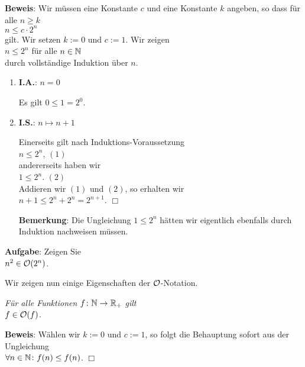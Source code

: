 \noindent
\textbf{Beweis}: Wir m\"ussen eine Konstante $c$ und eine Konstante $k$ angeben, so dass f\"ur
alle $n \geq k$
\\[0.1cm]
\hspace*{1.3cm} $ n \leq c \cdot 2^n$ \\[0.1cm]
gilt.  Wir setzen $k := 0$ und $c := 1$.  Wir zeigen \\[0.1cm]
\hspace*{1.3cm} $n \leq 2^n$ \quad f\"ur alle $n \in {\mathbb N}$ \\[0.1cm]
durch vollst\"andige Induktion \"uber $n$.
\begin{enumerate}
\item \textbf{I.A.}: $n = 0$

      Es gilt $0 \leq 1 = 2^0$.
\item \textbf{I.S.}: $n \mapsto n + 1$

      Einerseits gilt nach Induktions-Voraussetzung \\[0.1cm]
      \hspace*{1.3cm} $n \leq 2^n$, \hspace*{\fill} $(1)$ \\[0.1cm]
      andererseits haben wir \\[0.1cm]
      \hspace*{1.3cm} $1 \leq 2^n$. \hspace*{\fill} $(2)$ \\[0.1cm]
      Addieren wir $(1)$ und $(2)$, so erhalten wir \\[0.1cm]
      \hspace*{1.3cm} $n+1 \leq 2^n + 2^n = 2^{n+1}$. \hspace*{\fill} $\Box$

      \textbf{Bemerkung}: Die Ungleichung $1 \leq 2^n$ h\"atten wir eigentlich ebenfalls
      durch Induktion  nachweisen m\"ussen.
\end{enumerate}

\noindent
\textbf{Aufgabe}: Zeigen Sie \\[0.1cm]
\hspace*{1.3cm} $n^2 \in \mathcal{O}(2^n)$.
\vspace*{0.3cm}

\noindent
Wir zeigen nun einige Eigenschaften der $\mathcal{O}$-Notation.

\begin{Satz}[Reflexivit\"at]
{\em
  F\"ur alle Funktionen $f\colon {\mathbb N} \rightarrow {{\mathbb R}_+}$ gilt \\[0.1cm]
  \hspace*{1.3cm} $f \in \mathcal{O}(f)$. 
}
\end{Satz}
\textbf{Beweis}: W\"ahlen wir $k:=0$ und $c:=1$, so folgt die Behauptung sofort aus der
Ungleichung \\[0.1cm]
\hspace*{1.3cm} $\forall n \in {\mathbb N}\colon f(n) \leq f(n)$. \hspace*{\fill} $\Box$

